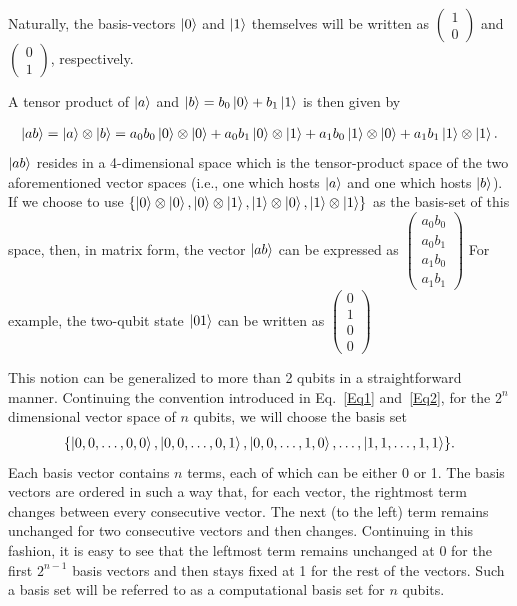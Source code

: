 \documentclass[12pt,oneside]{book}
\begin{document}
Naturally, the basis-vectors $\ket{0}$ and $\ket{1}$ themselves will be written as
$\begin{pmatrix}
        1\\
        0
    \end{pmatrix}$ and $\begin{pmatrix}
        0\\
        1
    \end{pmatrix}$, respectively.

A tensor product of $\ket{a}$ and $\ket{b}=b_0\ket{0}+b_1\ket{1}$ is then given by

\begin{align}\label{Eq2}
    \ket{ab}=\ket{a}\otimes\ket{b}=a_0b_0 \ket{0}\otimes\ket{0} + a_0b_1 \ket{0}\otimes\ket{1} +a_1b_0 \ket{1}\otimes\ket{0} + a_1b_1\ket{1}\otimes\ket{1}.
\end{align}
$\ket{ab}$ resides in a 4-dimensional space which is the tensor-product space of the two aforementioned vector spaces (i.e., one which hosts $\ket{a}$ and one which hosts $\ket{b}$). If we choose to use $\{\ket{0}\otimes\ket{0} , \ket{0}\otimes\ket{1}, \ket{1}\otimes\ket{0}, \ket{1}\otimes\ket{1}\}$ as the basis-set of this space, then, in matrix form, the vector $\ket{ab}$ can be expressed as $\begin{pmatrix}
    a_0b_0\\
    a_0b_1\\
    a_1b_0\\
    a_1b_1
\end{pmatrix}$
For example, the two-qubit state $\ket{01}$ can be written as $\begin{pmatrix}
    0\\
    1\\
    0\\
    0
\end{pmatrix}$

This notion can be generalized to more than 2 qubits in a straightforward manner. Continuing the convention introduced in Eq.~\ref{Eq1} and~\ref{Eq2}, for the $2^n$ dimensional vector space of $n$ qubits, we will choose the basis set
\begin{align*}
\{\ket{0,0,\hdots,0,0} , \ket{0,0,\hdots,0,1} , \ket{0,0,\hdots,1,0}, \hdots ,\ket{1,1,\hdots,1,1} \}.
\end{align*}
Each basis vector contains $n$ terms, each of which can be either 0 or 1. The basis vectors are ordered in such a way that, for each vector, the rightmost term changes between every consecutive vector. The next (to the left) term remains unchanged for two consecutive vectors and then changes. Continuing in this fashion, it is easy to see that the leftmost term remains unchanged at 0 for the first $2^{n-1}$ basis vectors and then stays fixed at 1 for the rest of the vectors. Such a basis set will be referred to as a computational basis set for $n$ qubits.
\end{document}
